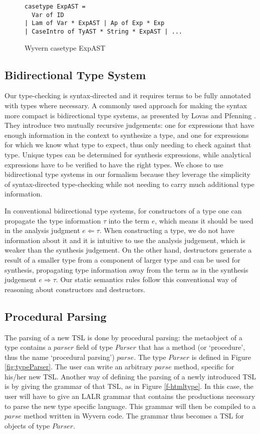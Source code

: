 \begin{figure}
\begin{lstlisting}
casetype ExpAST = 
  Var of ID 
| Lam of Var * ExpAST | Ap of Exp * Exp 
| CaseIntro of TyAST * String * ExpAST | ...
\end{lstlisting}
\caption{Wyvern casetype ExpAST}
\label{fig:wyvExpAST}
\end{figure}

\subsection{Bidirectional Type System}
Our type-checking is syntax-directed and it requires terms to be fully annotated with types where necessary. A commonly used approach for making the syntax more compact is bidirectional type systems, as presented by Lovas and Pfenning \cite{Lovas08abidirectional}. They introduce two mutually recursive judgements: one for expressions that have enough information in the context to synthesize a type, and one for expressions for which we know what type to expect, thus only needing to check against that type. Unique types can be determined for synthesis expressions, while analytical expressions have to be verified to have the right types. We chose to use bidirectional type systems in our formalism because they leverage the simplicity of syntax-directed type-checking while not needing to carry much additional type information.

In conventional bidirectional type systems, for constructors of a type one can propagate the type information $\tau$
into the term $e$, which means it should be used in the analysis
judgment $e \Leftarrow \tau$. When constructing a type, we do not have information about it and it is intuitive to use the analysis judgement, which is weaker than the synthesis judgement. On the other hand, destructors generate a result of a smaller type from a component of larger type and can be used for synthesis, propagating type information away from the term as in the synthesis judgement $e \Rightarrow \tau$. Our static semantics rules follow this conventional way of reasoning about constructors and destructors.

\subsection{Procedural Parsing}

The parsing of a new TSL is done by procedural parsing: the metaobject of a type contains a $parser$ field of type $Parser$ that has a method (or `procedure', thus the name `procedural parsing') $parse$. The type $Parser$ is defined in Figure \ref{fig:typeParser}. The user can write an arbitrary $parse$ method, specific for his/her new TSL. Another way of defining the parsing of a newly introduced TSL is by giving the grammar of that TSL, as in Figure \ref{f-htmltype}. In this case, the user will have to give an LALR grammar that contains the productions necessary to parse the new type specific language. This grammar will then be compiled to a $parse$ method written in Wyvern code. The grammar thus becomes a TSL for objects of type $Parser$. 

